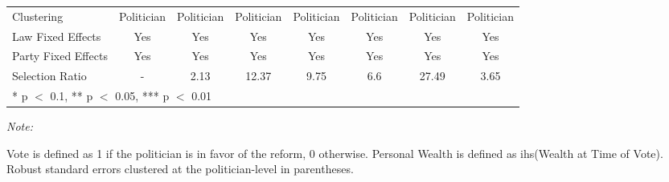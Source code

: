 \begin{table}[!h]
{\begin{threeparttable}
\begin{tabular}[t]{lccccccc}
Clustering & Politician & Politician & Politician & Politician & Politician & Politician & Politician\\
Law Fixed Effects & Yes & Yes & Yes & Yes & Yes & Yes & Yes\\
Party Fixed Effects & Yes & Yes & Yes & Yes & Yes & Yes & Yes\\
Selection Ratio & - & 2.13 & 12.37 & 9.75 & 6.6 & 27.49 & 3.65\\
\bottomrule
\multicolumn{8}{l}{\rule{0pt}{1em}* p $<$ 0.1, ** p $<$ 0.05, *** p $<$ 0.01}\\
\end{tabular}
\begin{tablenotes}[para]
\item \textit{Note:} 
\item Vote is defined as 1 if the politician is in favor of the reform, 0 otherwise. Personal Wealth is defined as ihs(Wealth at Time of Vote). Robust standard errors clustered at the politician-level in parentheses.
\end{tablenotes}
\end{threeparttable}}
\end{table}

